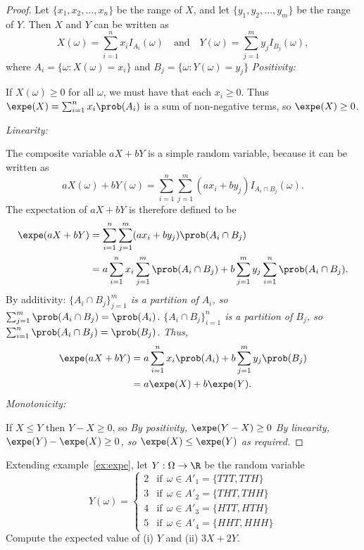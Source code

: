 \begin{proof}
Let $\{x_1,x_2,\ldots,x_n\}$ be the range of $X$, and let $\{y_1,y_2,\ldots,y_m\}$ be the range of $Y$. Then $X$ and $Y$ can be written as
\[
X(\omega) = \sum_{i=1}^n x_i I_{A_i}(\omega) \quad\text{and}\quad Y(\omega) = \sum_{j=1}^m y_j I_{B_j}(\omega),
\]
where $A_i = \{\omega:X(\omega)=x_i\}$ and $B_j = \{\omega:Y(\omega)=y_j\}$
\ben
\it %
Positivity: \par
If $X(\omega)\geq 0$ for all $\omega$, we must have that each $x_i\geq 0$. Thus $\expe(X) = \sum_{i=1}^n x_i \prob(A_i)$ is a sum of non-negative terms, so $\expe(X)\geq 0$.

\it %
Linearity:
\par
The composite variable $aX + bY$ is a simple random variable, because it can be written as
\[
aX(\omega) + bY(\omega) = \sum_{i=1}^n\sum_{j=1}^m (ax_i + by_j) I_{A_i\cap B_j}(\omega).
\]
The expectation of $aX+bY$ is therefore defined to be
\begin{align*}
\expe(aX+bY)
	& = \sum_{i=1}^n\sum_{j=1}^m (ax_i + by_j) \prob(A_i\cap B_j) \\
	& = a\sum_{i=1}^n x_i \sum_{j=1}^m \prob(A_i\cap B_j) + b\sum_{j=1}^m y_j \sum_{i=1}^n \prob(A_i\cap B_j).
\end{align*}
By additivity:
\bit
\it $\{A_i\cap B_j\}_{j=1}^m$ is a partition of $A_i$, so $\sum_{j=1}^m \prob(A_i\cap B_j) = \prob(A_i)$.
\it $\{A_i\cap B_j\}_{i=1}^n$ is a partition of $B_j$, so $\sum_{i=1}^n \prob(A_i\cap B_j) = \prob(B_j)$.
\eit
Thus,
\begin{align*}
\expe(aX+bY)
	& = a\sum_{i=1}^n x_i\prob(A_i) + b\sum_{j=1}^m y_j\prob(B_j) \\
	& = a\expe(X) + b\expe(Y).
\end{align*}
\it %
Monotonicity:
\par
If $X\leq Y$ then $Y-X\geq 0$, so
\bit
\it By positivity, $\expe(Y-X)\geq 0$
\it By linearity, $\expe(Y)-\expe(X)\geq 0$, so $\expe(X)\leq\expe(Y)$ as required.
\eit
\een
\end{proof}



\begin{example}
Extending example~\ref{ex:expe}, let $Y:\Omega\to\R$ be the random variable
\[
Y(\omega) = \begin{cases}
2	& \text{if}\ \ \omega\in A'_1=\{TTT,TTH\} \\
3	& \text{if}\ \ \omega\in A'_2=\{THT,THH\} \\
4	& \text{if}\ \ \omega\in A'_3=\{HTT,HTH\} \\
5	& \text{if}\ \ \omega\in A'_4=\{HHT,HHH\}
\end{cases}
\]
Compute the expected value of (i) $Y$ and (ii) $3X+2Y$.
\end{example}

